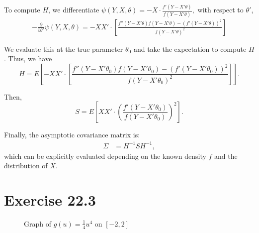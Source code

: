 \documentclass{article}
\begin{document}
To compute $H$, we differentiate $\psi(Y,X,\theta) = -X \cdot \frac{f'(Y - X'\theta)}{f(Y - X'\theta)},$ with respect to $\theta'$,
\begin{align*}
    -\frac{\partial}{\partial \theta'} \psi(Y,X,\theta) = -X X' \cdot \left[ \frac{f''(Y - X'\theta) f(Y - X'\theta) - (f'(Y - X'\theta))^2 }{ f(Y - X'\theta)^2 } \right]    
\end{align*}

We evaluate this at the true parameter $\theta_0$ and take the expectation to compute $H$. Thus, we have
\[
H=E\left[-X X' \cdot \left[ \frac{f''(Y - X'\theta_0) f(Y - X'\theta_0) - (f'(Y - X'\theta_0))^2 }{ f(Y - X'\theta_0)^2 } \right] \right].
\]

Then, 
\[
S = E\left[ X X' \cdot \left( \frac{f'(Y - X'\theta_0)}{f(Y - X'\theta_0)} \right)^2 \right].
\]

Finally, the asymptotic covariance matrix is:
\begin{align*}
    \Sigma
    &= H^{-1} S H^{-1},
\end{align*}
which can be explicitly evaluated depending on the known density $f$ and the distribution of $X$.

\section{Exercise 22.3}

\begin{figure}[htbp]
  \centering
  \caption{Graph of $g(u)=\tfrac14 u^{4}$ on $[-2,2]$}
  \label{fig:g_quarter_u4}
\end{figure}
\end{document}
